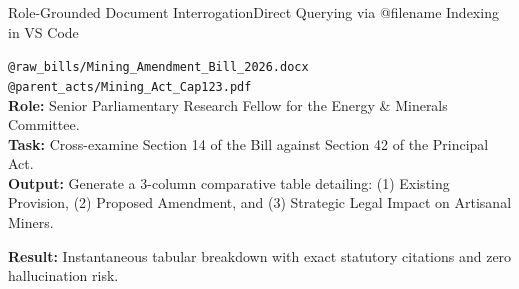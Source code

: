 \documentclass[aspectratio=169, 10pt]{beamer}
\begin{document}
\begin{frame}{Role-Grounded Document Interrogation}{Direct Querying via @filename Indexing in VS Code}
  \begin{tcolorbox}[colback=lightgrey, colframe=tanzaniablue, arc=1.5mm, boxrule=0.8pt, title=\textbf{Exemplary Parliamentary AI Command}]
    \small
    \texttt{@raw\_bills/Mining\_Amendment\_Bill\_2026.docx @parent\_acts/Mining\_Act\_Cap123.pdf}\\
    \vspace{3pt}
    \textcolor{suagreen}{\textbf{Role:}} Senior Parliamentary Research Fellow for the Energy \& Minerals Committee.\\
    \textcolor{tanzaniablue}{\textbf{Task:}} Cross-examine Section 14 of the Bill against Section 42 of the Principal Act.\\
    \textbf{Output:} Generate a 3-column comparative table detailing: (1) Existing Provision, (2) Proposed Amendment, and (3) Strategic Legal Impact on Artisanal Miners.
  \end{tcolorbox}
  \vspace{4pt}
  \begin{center}
    \scriptsize \textbf{\textcolor{suagreen}{Result:}} Instantaneous tabular breakdown with exact statutory citations and zero hallucination risk.
  \end{center}
\end{frame}
\end{document}
